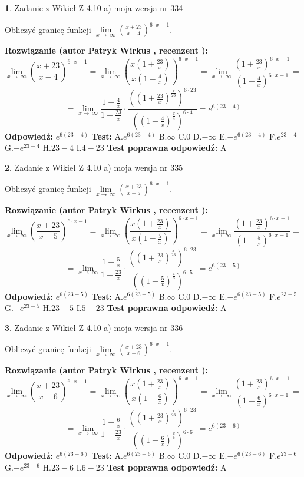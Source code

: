 \documentclass[12pt, a4paper]{article}
\theoremstyle{definition} %
\newtheorem{zad}{}
\newcommand{\zadStart}[1]{\begin{zad}#1\newline}
\newcommand{\zadStop}{\end{zad}}
\newcommand{\rozwStart}[2]{\noindent \textbf{Rozwiązanie (autor #1 , recenzent #2): }\newline}
\newcommand{\rozwStop}{\newline}
\newcommand{\odpStart}{\noindent \textbf{Odpowiedź:}\newline}
\newcommand{\odpStop}{\newline}
\newcommand{\testStart}{\noindent \textbf{Test:}\newline}
\newcommand{\testStop}{\newline}
\newcommand{\kluczStart}{\noindent \textbf{Test poprawna odpowiedź:}\newline}
\newcommand{\kluczStop}{\newline}
\begin{document}
\zadStart{Zadanie z Wikieł Z 4.10 a) moja wersja nr 334}


Obliczyć granicę funkcji  $\lim\limits_{x\to\ \infty}(\frac{x+23}{x-4})^{6\cdot x-1}$.
\zadStop
\rozwStart{Patryk Wirkus}{}
$$\lim\limits_{x\to\ \infty}(\frac{x+23}{x-4})^{6\cdot x-1} = \lim\limits_{x\to\ \infty}(\frac{x(1+\frac{23}{x})}{x(1-\frac{4}{x})})^{6\cdot x-1}=\lim\limits_{x\to\ \infty}\frac{(1+\frac{23}{x})^{6\cdot x-1}}{(1-\frac{4}{x})^{6\cdot x-1}}=$$
$$=\lim\limits_{x\to\ \infty}\frac{1-\frac{4}{x}}{1+\frac{23}{x}}\cdot\frac{((1+\frac{23}{x})^{\frac{x}{23}})^{6\cdot23}}{((1-\frac{4}{x})^{\frac{x}{4}})^{6\cdot4}}=e^{6(23-4)}$$
\rozwStop
\odpStart
$e^{6(23-4)}$
\odpStop
\testStart
A.$e^{6(23-4)}$ B.$\infty$ C.$0$ D.$-\infty$ E.$-e^{6(23-4)}$
F.$e^{23-4}$ G.$-e^{23-4}$
H.$23-4$
I.$4-23$
\testStop
\kluczStart
A
\kluczStop



\zadStart{Zadanie z Wikieł Z 4.10 a) moja wersja nr 335}


Obliczyć granicę funkcji  $\lim\limits_{x\to\ \infty}(\frac{x+23}{x-5})^{6\cdot x-1}$.
\zadStop
\rozwStart{Patryk Wirkus}{}
$$\lim\limits_{x\to\ \infty}(\frac{x+23}{x-5})^{6\cdot x-1} = \lim\limits_{x\to\ \infty}(\frac{x(1+\frac{23}{x})}{x(1-\frac{5}{x})})^{6\cdot x-1}=\lim\limits_{x\to\ \infty}\frac{(1+\frac{23}{x})^{6\cdot x-1}}{(1-\frac{5}{x})^{6\cdot x-1}}=$$
$$=\lim\limits_{x\to\ \infty}\frac{1-\frac{5}{x}}{1+\frac{23}{x}}\cdot\frac{((1+\frac{23}{x})^{\frac{x}{23}})^{6\cdot23}}{((1-\frac{5}{x})^{\frac{x}{5}})^{6\cdot5}}=e^{6(23-5)}$$
\rozwStop
\odpStart
$e^{6(23-5)}$
\odpStop
\testStart
A.$e^{6(23-5)}$ B.$\infty$ C.$0$ D.$-\infty$ E.$-e^{6(23-5)}$
F.$e^{23-5}$ G.$-e^{23-5}$
H.$23-5$
I.$5-23$
\testStop
\kluczStart
A
\kluczStop



\zadStart{Zadanie z Wikieł Z 4.10 a) moja wersja nr 336}


Obliczyć granicę funkcji  $\lim\limits_{x\to\ \infty}(\frac{x+23}{x-6})^{6\cdot x-1}$.
\zadStop
\rozwStart{Patryk Wirkus}{}
$$\lim\limits_{x\to\ \infty}(\frac{x+23}{x-6})^{6\cdot x-1} = \lim\limits_{x\to\ \infty}(\frac{x(1+\frac{23}{x})}{x(1-\frac{6}{x})})^{6\cdot x-1}=\lim\limits_{x\to\ \infty}\frac{(1+\frac{23}{x})^{6\cdot x-1}}{(1-\frac{6}{x})^{6\cdot x-1}}=$$
$$=\lim\limits_{x\to\ \infty}\frac{1-\frac{6}{x}}{1+\frac{23}{x}}\cdot\frac{((1+\frac{23}{x})^{\frac{x}{23}})^{6\cdot23}}{((1-\frac{6}{x})^{\frac{x}{6}})^{6\cdot6}}=e^{6(23-6)}$$
\rozwStop
\odpStart
$e^{6(23-6)}$
\odpStop
\testStart
A.$e^{6(23-6)}$ B.$\infty$ C.$0$ D.$-\infty$ E.$-e^{6(23-6)}$
F.$e^{23-6}$ G.$-e^{23-6}$
H.$23-6$
I.$6-23$
\testStop
\kluczStart
A
\kluczStop
\end{document}
